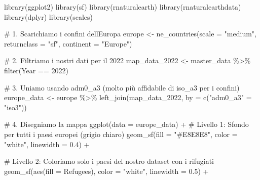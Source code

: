 \documentclass[
  letterpaper,
  DIV=11,
  numbers=noendperiod]{scrartcl}
\newenvironment{Shaded}{\begin{snugshade}}{\end{snugshade}}
\newcommand{\AttributeTok}[1]{\textcolor[rgb]{0.40,0.45,0.13}{#1}}
\newcommand{\CommentTok}[1]{\textcolor[rgb]{0.37,0.37,0.37}{#1}}
\newcommand{\DecValTok}[1]{\textcolor[rgb]{0.68,0.00,0.00}{#1}}
\newcommand{\FloatTok}[1]{\textcolor[rgb]{0.68,0.00,0.00}{#1}}
\newcommand{\FunctionTok}[1]{\textcolor[rgb]{0.28,0.35,0.67}{#1}}
\newcommand{\NormalTok}[1]{\textcolor[rgb]{0.00,0.23,0.31}{#1}}
\newcommand{\OtherTok}[1]{\textcolor[rgb]{0.00,0.23,0.31}{#1}}
\newcommand{\SpecialCharTok}[1]{\textcolor[rgb]{0.37,0.37,0.37}{#1}}
\newcommand{\StringTok}[1]{\textcolor[rgb]{0.13,0.47,0.30}{#1}}
\begin{document}
\begin{Shaded}
\begin{Highlighting}[]
\FunctionTok{library}\NormalTok{(ggplot2)}
\FunctionTok{library}\NormalTok{(sf)}
\FunctionTok{library}\NormalTok{(rnaturalearth)}
\FunctionTok{library}\NormalTok{(rnaturalearthdata)}
\FunctionTok{library}\NormalTok{(dplyr)}
\FunctionTok{library}\NormalTok{(scales)}

\CommentTok{\# 1. Scarichiamo i confini dell\textquotesingle{}Europa}
\NormalTok{europe }\OtherTok{\textless{}{-}} \FunctionTok{ne\_countries}\NormalTok{(}\AttributeTok{scale =} \StringTok{"medium"}\NormalTok{, }\AttributeTok{returnclass =} \StringTok{"sf"}\NormalTok{, }\AttributeTok{continent =} \StringTok{"Europe"}\NormalTok{)}

\CommentTok{\# 2. Filtriamo i nostri dati per il 2022}
\NormalTok{map\_data\_2022 }\OtherTok{\textless{}{-}}\NormalTok{ master\_data }\SpecialCharTok{\%\textgreater{}\%} \FunctionTok{filter}\NormalTok{(Year }\SpecialCharTok{==} \DecValTok{2022}\NormalTok{)}

\CommentTok{\# 3. Uniamo usando adm0\_a3 (molto più affidabile di iso\_a3 per i confini)}
\NormalTok{europe\_data }\OtherTok{\textless{}{-}}\NormalTok{ europe }\SpecialCharTok{\%\textgreater{}\%} 
  \FunctionTok{left\_join}\NormalTok{(map\_data\_2022, }\AttributeTok{by =} \FunctionTok{c}\NormalTok{(}\StringTok{"adm0\_a3"} \OtherTok{=} \StringTok{"iso3"}\NormalTok{))}

\CommentTok{\# 4. Disegniamo la mappa}
\FunctionTok{ggplot}\NormalTok{(}\AttributeTok{data =}\NormalTok{ europe\_data) }\SpecialCharTok{+}
  \CommentTok{\# Livello 1: Sfondo per tutti i paesi europei (grigio chiaro)}
  \FunctionTok{geom\_sf}\NormalTok{(}\AttributeTok{fill =} \StringTok{"\#E8E8E8"}\NormalTok{, }\AttributeTok{color =} \StringTok{"white"}\NormalTok{, }\AttributeTok{linewidth =} \FloatTok{0.4}\NormalTok{) }\SpecialCharTok{+}
  
  \CommentTok{\# Livello 2: Coloriamo solo i paesi del nostro dataset con i rifugiati}
  \FunctionTok{geom\_sf}\NormalTok{(}\FunctionTok{aes}\NormalTok{(}\AttributeTok{fill =}\NormalTok{ Refugees), }\AttributeTok{color =} \StringTok{"white"}\NormalTok{, }\AttributeTok{linewidth =} \FloatTok{0.5}\NormalTok{) }\SpecialCharTok{+}
  

\end{Highlighting}
\end{Shaded}
\end{document}
